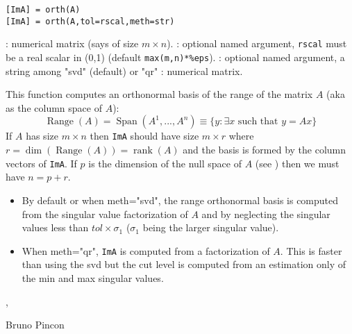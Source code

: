 \begin{mandesc}
\end{mandesc}
\begin{calling_sequence}
\begin{verbatim}
[ImA] = orth(A) 
[ImA] = orth(A,tol=rscal,meth=str) 
\end{verbatim}
\end{calling_sequence}
\begin{parameters}
  \begin{varlist}
    :  numerical matrix (says of size $m \times n$).
    : optional named argument, \verb+rscal+ must be  a real scalar in (0,1) (default \verb+max(m,n)*%eps+).
    : optional named argument, a string among "svd" (default) or "qr"
    : numerical matrix.
  \end{varlist}
\end{parameters}
\begin{mandescription}
This function computes an orthonormal basis of the range of the
matrix $A$ (aka as the column space of $A$):
$$
\mathop{\mathrm{Range}}(A) = \mathop{\mathrm{Span}}(A^1,...,A^n) \equiv \{ y : \exists x \text{ such that } y = Ax \}  
$$
 If $A$ has size $m \times n$ then \verb+ImA+ should have 
size $m \times r$ where $r = \mathop{\mathrm{dim}}(\mathop{\mathrm{Range}}(A)) = \mathop{\mathrm{rank}}(A)$
and the basis is formed by the column vectors of \verb+ImA+.
 If $p$ is the dimension of the null space of $A$ (see )
then we must have $n = p + r$.
\begin{itemize}
\item By default or when  meth="svd", the range orthonormal basis 
is computed from the singular value factorization of $A$ and by 
neglecting the singular values less than $tol \times \sigma_1$
($\sigma_1$ being the larger singular value). 
\item When  meth="qr", \verb+ImA+ is computed from a  
factorization of $A$. This is faster than using the svd but 
the cut level is computed from an estimation only of the min 
and max singular values.
\end{itemize}
\end{mandescription}

\begin{examples}
  \begin{program}  
\end{program}
\end{examples}

\begin{manseealso}
   ,   
\end{manseealso}

\begin{authors}
   Bruno Pincon
\end{authors}
